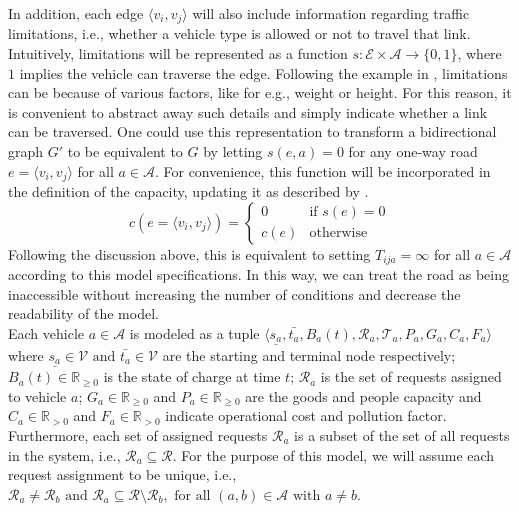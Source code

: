 In addition, each edge $\langle v_i, v_j \rangle$ will also include information regarding traffic limitations, i.e., whether a vehicle type is allowed or not to travel that link. Intuitively, limitations will be represented as a function $s: \mathcal{E} \times \mathcal{A} \rightarrow\{0,1\}$, where $1$ implies the vehicle can traverse the edge. Following the example in \cite{project_thesis}, limitations can be because of various factors, like for e.g., weight or height. For this reason, it is convenient to abstract away such details and simply indicate whether a link can be traversed. One could use this representation to transform a bidirectional graph $G'$ to be equivalent to $G$ by letting $s(e,a) = 0$ for any one-way road $e = \langle v_i, v_j \rangle$ for all $a \in \mathcal{A}$. For convenience, this function will be incorporated in the definition of the capacity, updating it as described by . 
\begin{equation}
	c(e = \langle v_i, v_j \rangle) = 
	\begin{cases}
		0 & \text{if } s(e) = 0 \\
		c(e) & \text{otherwise}
	\end{cases}
	\label{eq:capacity}
\end{equation}
Following the discussion above, this is equivalent to setting $T_{ija} = \infty$ for all $a \in \mathcal{A}$ according to this model specifications. In this way, we can treat the road as being inaccessible without increasing the number of conditions and decrease the readability of the model. \\
Each vehicle $a\in \mathcal{A}$ is modeled as a tuple $\langle \underline{s_a},\bar{t_a}, B_a(t),\mathcal{R}_a, \mathcal{T}_a, P_a, G_a, C_a, F_a \rangle$ where $\underline{s_a}\in \mathcal{V} \text{ and } \bar{t_a}\in \mathcal{V}$ are the starting and terminal node respectively; $B_a(t)\in \mathbb{R}_{\ge0}$ is the state of charge at time $t$; $\mathcal{R}_a$ is the set of requests assigned to vehicle $a$; $G_a \in \mathbb{R}_{\ge0}$ and $P_a \in \mathbb{R}_{\ge0}$ are the goods and people capacity and $C_a \in \mathbb{R}_{>0}$ and $F_a \in \mathbb{R}_{>0}$ indicate operational cost and pollution factor. Furthermore, each set of assigned requests $\mathcal{R}_a$ is a subset of the set of all requests in the system, i.e., $\mathcal{R}_a \subseteq\mathcal{R}$. For the purpose of this model, we will assume each request assignment to be unique, i.e., $\mathcal{R}_a \neq \mathcal{R}_b \text{ and } \mathcal{R}_a \subseteq \mathcal{R} \setminus \mathcal{R}_b, \text{ for all } (a,b) \in \mathcal{A} \text{ with } a\neq b$. \\
